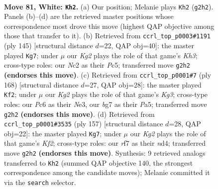 \documentclass[11pt]{article}
\begin{document}
\clearpage

\begin{figure}[p]\centering
\begin{subfigure}{0.46\textwidth}\centering
\resizebox{\linewidth}{!}{%
\newchessgame
\chessboard[
  setfen={6k1/5rb1/R1P5/6R1/8/8/2N3K1/8 w - - 1 81},
  showmover=false,
  pgfstyle=straightmove, color=movearrow, markmove={g2-h2}
]}
\caption{}
\end{subfigure}\hfill
\begin{subfigure}{0.46\textwidth}\centering
\resizebox{\linewidth}{!}{%
\newchessgame
\chessboard[
  setfen={8/8/7k/2p5/2r1BRK1/8/8/8 b - - 1 73},
  showmover=false,
  pgfstyle=straightmove, color=movearrow, markmove={h6-g7}
]}
\caption{}
\end{subfigure}
\\[4pt]
\begin{subfigure}{0.46\textwidth}\centering
\resizebox{\linewidth}{!}{%
\newchessgame
\chessboard[
  setfen={8/5p2/r5b1/P3k3/R7/4N1K1/8/8 w - - 7 85},
  showmover=false,
  pgfstyle=straightmove, color=movearrow, markmove={g3-f2}
]}
\caption{}
\end{subfigure}\hfill
\begin{subfigure}{0.46\textwidth}\centering
\resizebox{\linewidth}{!}{%
\newchessgame
\chessboard[
  setfen={5n2/1r3k2/R7/1B1K4/3N4/8/8/8 b - - 20 79},
  showmover=false,
  pgfstyle=straightmove, color=movearrow, markmove={f7-g7}
]}
\caption{}
\end{subfigure}
\caption{\textbf{Move 81, White: \texttt{Kh2}.} (a) Our position; Melanie plays \texttt{Kh2} (\texttt{g2h2}). Panels (b)--(d) are the retrieved master positions whose correspondence most drove this move (highest QAP objective among those that transfer to it). (b) Retrieved from \texttt{ccrl\_top\_p0003\#1191} (ply 145) [structural distance $d$=22, QAP obj=40]: the master played \texttt{Kg7}; under $\mu$ our \emph{Kg2} plays the role of that game's \emph{Kh3}; cross-type roles: our \emph{N}c2 as their \emph{P}c5; transferred move \texttt{g2h2} \textbf{(endorses this move)}. (c) Retrieved from \texttt{ccrl\_top\_p0001\#7} (ply 168) [structural distance $d$=27, QAP obj=28]: the master played \texttt{Kf2}; under $\mu$ our \emph{Kg2} plays the role of that game's \emph{Kg3}; cross-type roles: our \emph{P}c6 as their \emph{N}e3, our \emph{b}g7 as their \emph{P}a5; transferred move \texttt{g2h2} \textbf{(endorses this move)}. (d) Retrieved from \texttt{ccrl\_top\_p0001\#3535} (ply 157) [structural distance $d$=28, QAP obj=22]: the master played \texttt{Kg7}; under $\mu$ our \emph{Kg2} plays the role of that game's \emph{Kf2}; cross-type roles: our \emph{r}f7 as their \emph{n}d4; transferred move \texttt{g2h2} \textbf{(endorses this move)}. Synthesis: 9 retrieved analogs transferred to \texttt{Kh2} (summed QAP objective 140, the strongest correspondence among the candidate moves); Melanie committed it via the \texttt{search} selector.}
\label{fig:thought-m160}
\end{figure}
\end{document}
